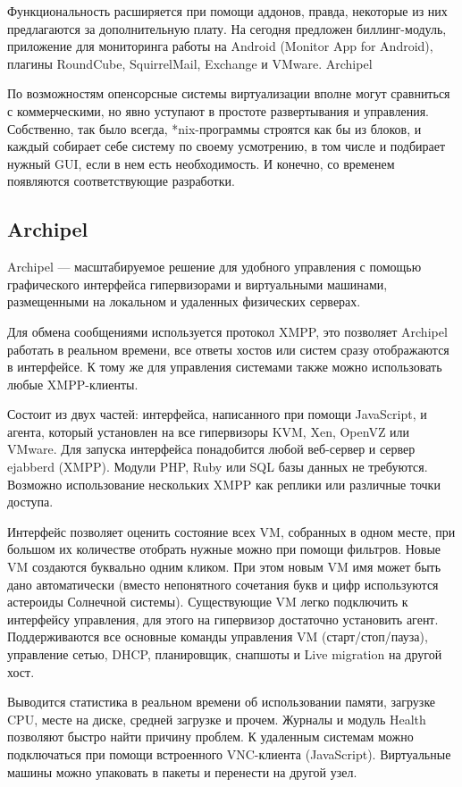 Функциональность расширяется при помощи аддонов, правда, некоторые из них предлагаются за дополнительную плату. На сегодня предложен биллинг-модуль, приложение для мониторинга работы на Android (Monitor App for Android), плагины RoundCube, SquirrelMail, Exchange и VMware.
Archipel
 
По возможностям опенсорсные системы виртуализации вполне могут сравниться с коммерческими, но явно уступают в простоте развертывания и управления. Собственно, так было всегда, *nix-программы строятся как бы из блоков, и каждый собирает себе систему по своему усмотрению, в том числе и подбирает нужный GUI, если в нем есть необходимость. И конечно, со временем появляются соответствующие разработки.

\subsection{Archipel}
Archipel — масштабируемое решение для удобного управления с помощью графического интерфейса гипервизорами и виртуальными машинами, размещенными на локальном и удаленных физических серверах. 

Для обмена сообщениями используется протокол XMPP, это позволяет Archipel работать в реальном времени, все ответы хостов или систем сразу отображаются в интерфейсе. К тому же для управления системами также можно использовать любые XMPP-клиенты.

Состоит из двух частей: интерфейса, написанного при помощи JavaScript, и агента, который установлен на все гипервизоры KVM, Xen, OpenVZ или VMware. Для запуска интерфейса понадобится любой веб-сервер и сервер ejabberd (XMPP). Модули PHP, Ruby или SQL базы данных не требуются. Возможно использование нескольких XMPP как реплики или различные точки доступа. 

Интерфейс позволяет оценить состояние всех VM, собранных в одном месте, при большом их количестве отобрать нужные можно при помощи фильтров. Новые VM создаются буквально одним кликом. При этом новым VM имя может быть дано автоматически (вместо непонятного сочетания букв и цифр используются астероиды Солнечной системы). Существующие VM легко подключить к интерфейсу управления, для этого на гипервизор достаточно установить агент. Поддерживаются все основные команды управления VM (старт/стоп/пауза), управление сетью, DHCP, планировщик, снапшоты и Live migration на другой хост. 

Выводится статистика в реальном времени об использовании памяти, загрузке CPU, месте на диске, средней загрузке и прочем. Журналы и модуль Health позволяют быстро найти причину проблем. К удаленным системам можно подключаться при помощи встроенного VNC-клиента (JavaScript). Виртуальные машины можно упаковать в пакеты и перенести на другой узел.


